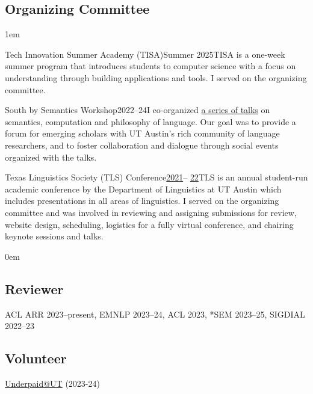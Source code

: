 \subsection{Organizing Committee}

\leftskip1em\relax

\smallentry
  {\large Tech Innovation Summer Academy (TISA)}{\large Summer 2025}{TISA is a one-week summer program that introduces students to computer science with a focus on understanding through building applications and tools. I served on the organizing committee.}

\smallentry
  {\large South by Semantics Workshop}{\large 2022--24}{I co-organized \href{https://sites.utexas.edu/sxsemantics/}{a series of talks} on semantics, computation and philosophy of language. Our goal was to provide a forum for emerging scholars with UT Austin's rich community of language researchers, and to foster collaboration and dialogue through social events organized with the talks.}
  
\smallentry
    {\large Texas Linguistics Society (TLS) Conference}{\large \href{http://tls.ling.utexas.edu/2021/}{2021}-- \href{http://tls.ling.utexas.edu/2022/}{22}}{TLS is an annual student-run academic conference by the Department of Linguistics at UT Austin which includes presentations in all areas of linguistics. I served on the organizing committee and was involved in reviewing and assigning submissions for review, website design, scheduling, logistics for a fully virtual conference, and chairing keynote sessions and talks.}

\leftskip0em\relax

\subsection{Reviewer}

\quad ACL ARR 2023--present, EMNLP 2023--24, ACL 2023, *SEM 2023--25, SIGDIAL 2022--23

\subsection{Volunteer}

\quad \href{http://underpaidatut.org}{Underpaid\makeatletter @\makeatother UT} (2023-24)
